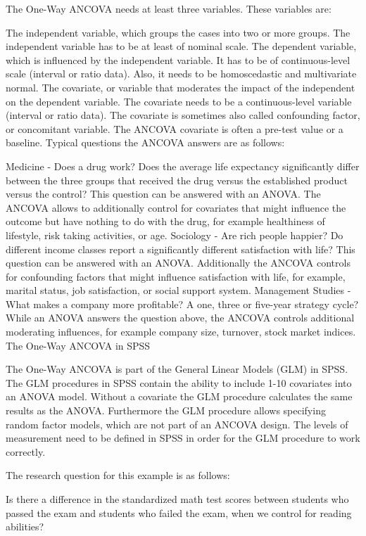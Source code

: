 The One-Way ANCOVA needs at least three variables.  These variables are:

The independent variable, which groups the cases into two or more groups.  The independent variable has to be at least of nominal scale.
The dependent variable, which is influenced by the independent variable.  It has to be of continuous-level scale (interval or ratio data).  Also, it needs to be homoscedastic and multivariate normal.
The covariate, or variable that moderates the impact of the independent on the dependent variable.  The covariate needs to be a continuous-level variable (interval or ratio data).  The covariate is sometimes also called confounding factor, or concomitant variable.  The ANCOVA covariate is often a pre-test value or a baseline.
Typical questions the ANCOVA answers are as follows:

Medicine - Does a drug work? Does the average life expectancy significantly differ between the three groups that received the drug versus the established product versus the control? This question can be answered with an ANOVA.  The ANCOVA allows to additionally control for covariates that might influence the outcome but have nothing to do with the drug, for example healthiness of lifestyle, risk taking activities, or age.
Sociology - Are rich people happier? Do different income classes report a significantly different satisfaction with life? This question can be answered with an ANOVA.  Additionally the ANCOVA controls for confounding factors that might influence satisfaction with life, for example, marital status, job satisfaction, or social support system.
Management Studies - What makes a company more profitable? A one, three or five-year strategy cycle? While an ANOVA answers the question above, the ANCOVA controls additional moderating influences, for example company size, turnover, stock market indices.
The One-Way ANCOVA in SPSS

The One-Way ANCOVA is part of the General Linear Models (GLM) in SPSS.  The GLM procedures in SPSS contain the ability to include 1-10 covariates into an ANOVA model.  Without a covariate the GLM procedure calculates the same results as the ANOVA.  Furthermore the GLM procedure allows specifying random factor models, which are not part of an ANCOVA design.  The levels of measurement need to be defined in SPSS in order for the GLM procedure to work correctly.

The research question for this example is as follows:

Is there a difference in the standardized math test scores between students who passed the exam and students who failed the exam, when we control for reading abilities?

